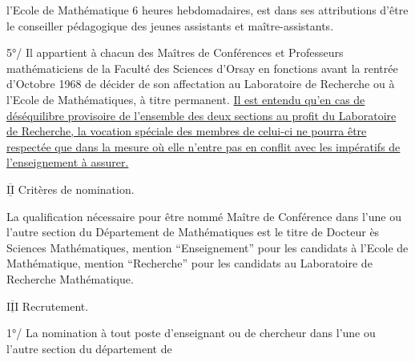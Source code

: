 
l'Ecole de Mathématique  6 heures hebdomadaires, est dans ses attributions d'être le conseiller pédagogique des jeunes assistants et maître-assistants.

5°/ Il appartient à chacun des Maîtres de Conférences et Professeurs mathématiciens de la Faculté des Sciences d'Orsay en fonctions avant la rentrée d'Octobre 1968 de décider de son affectation au Laboratoire de Recherche ou à l'Ecole de Mathématiques, à titre permanent. \uline{Il est entendu qu'en cas de déséquilibre provisoire de l'ensemble des deux sections au profit du Laboratoire de Recherche, la vocation spéciale des membres de celui-ci ne pourra être respectée que dans la mesure où elle n'entre pas en conflit avec les impératifs de l'enseignement à assurer.}

$\overline{\underline{\mathrm{II}}}$ Critères de nomination.

La qualification nécessaire pour être nommé Maître de Conférence dans l'une ou l'autre section du Département de Mathématiques est le titre de Docteur ès Sciences Mathématiques, mention ``Enseignement'' pour les candidats à l'Ecole de Mathématique, mention ``Recherche'' pour les candidats au Laboratoire de Recherche Mathématique.

$\overline{\underline{\mathrm{III}}}$ Recrutement.

1°/ La nomination à tout poste d'enseignant ou de chercheur dans l'une ou l'autre section du département de

